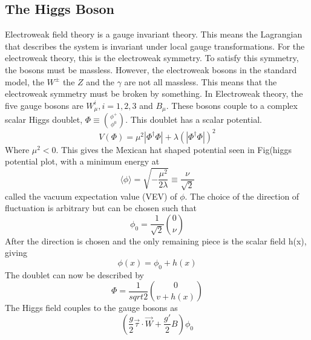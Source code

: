 \subsection{The Higgs Boson}
Electroweak field theory is a gauge invariant theory. This means the Lagrangian that describes the system is invariant under local gauge transformations. For the electroweak theory, this is the electroweak symmetry. To satisfy this symmetry, the bosons must be massless. However, the electroweak bosons in the standard model, the ${W^{\pm}}$ the ${Z}$ and the ${\gamma}$ are not all massless. This means that the electroweak symmetry must be broken by something.\linebreak
\indent In Electroweak theory, the five gauge bosons are ${W^{i}_{\mu}, i = 1,2,3}$ and ${B_{\mu}}$. These bosons couple to a complex scalar Higgs doublet, ${\Phi \equiv \binom{\phi^{+}}{\phi^{0}}}$. This doublet has a scalar potential.
\begin{equation}
V(\Phi) = \mu^{2}|\Phi^{\dagger}\Phi| + \lambda(|\Phi^{\dagger}\Phi|)^{2}
\end{equation}
Where ${\mu^{2} < 0}$. This gives the Mexican hat shaped potential seen in Fig(higgs potential plot, with a minimum energy at 
\begin{equation}
\langle \phi \rangle = \sqrt{-\frac{\mu^{2}}{2\lambda}}\equiv \frac{\nu}{\sqrt{2}}
\end{equation}
called the vacuum expectation value (VEV) of ${\phi}$. The choice of the direction of fluctuation is arbitrary but can be chosen such that 
\begin{equation}
\phi_{0} = \frac{1}{\sqrt{2}} \binom{0}{\nu}
\end{equation}
After the direction is chosen and the only remaining piece is the scalar field h(x), giving 
\begin{equation}
\phi(x) = \phi_{0} + h(x)
\end{equation}
The doublet can now be described by 
\begin{equation}
\Phi = \frac{1}{sqrt{2}} \binom{0}{v+h(x)}
\end{equation}
The Higgs field couples to the gauge bosons as 
\begin{equation}
(\frac{g}{2}\overrightarrow{\tau}\cdot \overrightarrow{W} + \frac{g'}{2}B)\phi_{0}
\end{equation}
